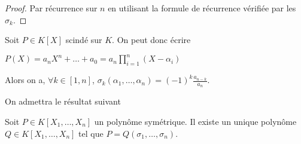 \begin{proof}
Par récurrence sur $n$ en utilisant la formule de récurrence vérifiée par les $\sigma_k$.
\end{proof}

\begin{thm}
Soit $P \in K[X]$ scindé sur $K$. On peut donc écrire

$P(X) = a_n X^n + \ldots + a_0 = a_n \prod_{i=1}^n (X - \alpha_i)$

Alors on a, $\forall k \in [1,n]$, $\sigma_k(\alpha_1,\ldots,\alpha_n) = (-1)^k \frac{a_{n-k}}{a_n}$.
\end{thm}

On admettra le résultat suivant

\begin{thm}
Soit $P \in K[X_1,\ldots,X_n]$ un polynôme symétrique. Il existe un unique polynôme $Q \in K[X_1,\ldots,X_n]$ tel que $P = Q(\sigma_1,\ldots,\sigma_n)$.
\end{thm}